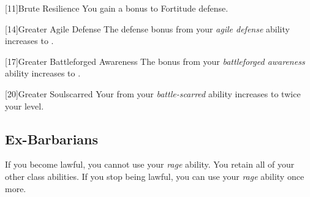         [11]{Brute Resilience}
        You gain a  bonus to Fortitude defense.

        [14]{Greater Agile Defense}
        The defense bonus from your \textit{agile defense} ability increases to .

        [17]{Greater Battleforged Awareness}
        The bonus from your \textit{battleforged awareness} ability increases to .

        [20]{Greater Soulscarred}
        Your  from your \textit{battle-scarred} ability increases to twice your level.

    \subsection{Ex-Barbarians}
        If you become lawful, you cannot use your \textit{rage} ability.
        You retain all of your other class abilities.
        If you stop being lawful, you can use your \textit{rage} ability once more.

\newpage
